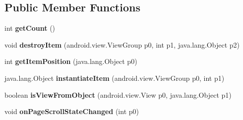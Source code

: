 \subsection*{Public Member Functions}
\begin{DoxyCompactItemize}
\item 
\mbox{\label{classmd5b60ffeb829f638581ab2bb9b1a7f4f3f_1_1CarouselPageAdapter_a0e49bdba4f14c96d9de8981bdcd0654c}} 
int {\bfseries get\+Count} ()
\item 
\mbox{\label{classmd5b60ffeb829f638581ab2bb9b1a7f4f3f_1_1CarouselPageAdapter_ac769d6b98fd82eba086700268f65e1b0}} 
void {\bfseries destroy\+Item} (android.\+view.\+View\+Group p0, int p1, java.\+lang.\+Object p2)
\item 
\mbox{\label{classmd5b60ffeb829f638581ab2bb9b1a7f4f3f_1_1CarouselPageAdapter_a3033cdd51c82c723fde4d8a68493d1a1}} 
int {\bfseries get\+Item\+Position} (java.\+lang.\+Object p0)
\item 
\mbox{\label{classmd5b60ffeb829f638581ab2bb9b1a7f4f3f_1_1CarouselPageAdapter_adc3ae71455cc6ba15871925d4a065505}} 
java.\+lang.\+Object {\bfseries instantiate\+Item} (android.\+view.\+View\+Group p0, int p1)
\item 
\mbox{\label{classmd5b60ffeb829f638581ab2bb9b1a7f4f3f_1_1CarouselPageAdapter_a12525022977645735ade145e4b25585a}} 
boolean {\bfseries is\+View\+From\+Object} (android.\+view.\+View p0, java.\+lang.\+Object p1)
\item 
\mbox{\label{classmd5b60ffeb829f638581ab2bb9b1a7f4f3f_1_1CarouselPageAdapter_ac569e2268db74e1784f77688be58f5e4}} 
void {\bfseries on\+Page\+Scroll\+State\+Changed} (int p0)
\item 
\mbox{\label{classmd5b60ffeb829f638581ab2bb9b1a7f4f3f_1_1CarouselPageAdapter_ae15db51016113a498393c866a8158d15}} 

\end{DoxyCompactItemize}
